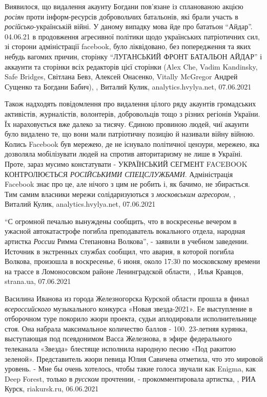 Виявилося, що видалення акаунту Богдани пов'язане із спланованою акцією \emph{росіян}
проти інформ-ресурсів добровольчих батальонів, які брали участь в
\emph{російсько}-українській війні. У даному випадку мова йде про бататьон \enquote{Айдар}.
04.06.21 в продовження агресивної політики щодо українських патріотичних сил,
зі сторони адміністрації facebook, було ліквідовано, без попередження та яких
небудь вагомих причин, сторінку \enquote{ЛУГАНСЬКИЙ ФРОНТ БАТАЛЬОН АЙДАР} і аккаунти та
сторінки всіх редакторів цієї сторінки (Alex Che, Vadim Kandinsky, Safe
Bridges, Світлана Бевз, Алексей Онасенко, Vitally McGregor Андрей Сущенко та
Богдани Бабич),
, Виталий Кулик, analytics.hvylya.net, 07.06.2021

Також надходять повідомлення про видалення цілого ряду акаунтів громадських
активістів, журналістів, волонтерів, добровольців тощо з різних регіонів
України. Їх нараховується вже далеко за тисячу. Єдиною провиною людей, чиї
акаунти було видалено те, що вони мали патріотичну позицію й називали війну
війною.  Колись Facebook був мережею, де не існувало політичної цензури,
мережею, яка дозволяла мобілізувати людей на спротив авторитаризму не лише в
Україні. Проте, зараз мусимо констатувати - УКРАЇНСЬКИЙ СЕГМЕНТ FACEBOOK
КОНТРОЛЮЄТЬСЯ \emph{РОСІЙСЬКИМИ СПЕЦСЛУЖБАМИ}.  Адміністрація Facebook знає про це,
але нічого з цим не робить і, як бачимо, не збирається. Тим самим власники
мережи солідаризуються з \emph{московським агресором},
, Виталий Кулик, analytics.hvylya.net, 07.06.2021

\enquote{С огромной печалью вынуждены сообщить, что в воскресенье вечером в
ужасной автокатастрофе погибла преподаватель вокального отдела, народная
артистка \emph{России} Римма Степановна Волкова}, - заявили в учебном заведении.
Источник в экстренных службах сообщил, что авария, в которой погибла Волкова,
произошла в воскресенье, 6 июня, около 17:30 по московскому времени на трассе в
Ломоносовском районе Ленинградской области,
, Илья Кравцов, strana.ua, 07.06.2021

Василина Иванова из города Железногорска Курской области прошла в финал
\emph{всероссийского} музыкального конкурса «Новая звезда-2021». Ее выступление
в отборочном туре покорило жюри проекта, судьи аплодировали исполнительнице
стоя.  Она набрала максимальное количество баллов - 100.  23-летняя курянка,
выступающая под псевдонимом Васса Железнова, в эфире федерального телеканала
«Звезда» блестяще исполнила народную песню «Под ракитою зеленой». Представитель
жюри певица Юлия Савичева отметила, что это мировой уровень. - Мне бы очень
хотелось, чтобы такие голоса звучали как Enigma, как Deep Forest, только в
\emph{русском} прочтении, - прокомментировала артистка,
, РИА Курск, riakursk.ru, 06.06.2021

